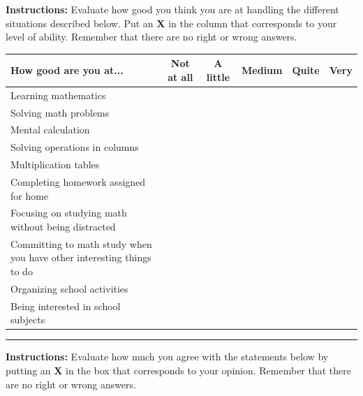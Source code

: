 \documentclass[11pt]{article}
\begin{document}
\newpage

\noindent\textbf{Instructions:} Evaluate how good you think you are at handling the different situations described below. Put an \textbf{X} in the column that corresponds to your level of ability. Remember that there are no right or wrong answers. 
\newline

\noindent\begin{tabular}{|p{7cm}|c|c|c|c|c|}
  \hline
  \textbf{How good are you at...} & \textbf{Not at all} & \textbf{A little} & \textbf{Medium} & \textbf{Quite} & \textbf{Very} \\
  \hline
  Learning mathematics & & & & & \\
  \hline
  Solving math problems & & & & & \\
  \hline
  Mental calculation & & & & & \\
  \hline
  Solving operations in columns & & & & & \\
  \hline
  Multiplication tables & & & & & \\
  \hline
  Completing homework assigned for home & & & & & \\
  \hline 
  Focusing on studying math without being distracted & & & & & \\
  \hline
  Committing to math study when you have other interesting things to do & & & & & \\
  \hline
  Organizing school activities & & & & & \\
  \hline
  Being interested in school subjects & & & & & \\
  \hline
\end{tabular}

\newpage

\medskip\hrule \medskip 
\noindent\textbf{Instructions:} Evaluate how much you agree with the statements below by putting an \textbf{X} in the box that corresponds to your opinion. Remember that there are no right or wrong answers. 
\newline
\end{document}
